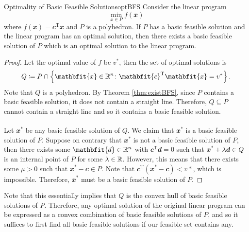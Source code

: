 \documentclass[math, code]{amznotes}
\theoremstyle{remark}
\begin{document}
\begin{thmbox}{Optimality of Basic Feasible Solutions}{optBFS}
    Consider the linear program 
    \begin{equation*}
        \min_{\mathbfit{x} \in P} f(\mathbfit{x})
    \end{equation*}
    where $f(\mathbfit{x}) = \mathbfit{c}^{\mathrm{T}}\mathbfit{x}$ and $P$ is a polyhedron. If $P$ has a basic feasible solution and the linear program has an optimal solution, then there exists a basic feasible solution of $P$ which is an optimal solution to the linear program.
    \tcblower
    \begin{proof}
        Let the optimal value of $f$ be $v^*$, then the set of optimal solutions is
        \begin{equation*}
            Q \coloneqq P \cap \left\{\mathbfit{x} \in \R^n \colon \mathbfit{c}^{\mathrm{T}}\mathbfit{x} = v^*\right\}.
        \end{equation*}
        Note that $Q$ is a polyhedron. By Theorem \ref{thm:existBFS}, since $P$ contains a basic feasible solution, it does not contain a straight line. Therefore, $Q \subseteq P$ cannot contain a straight line and so it contains a basic feasible solution.
        \\\\
        Let $\mathbfit{x}^*$ be any basic feasible solution of $Q$. We claim that $\mathbfit{x}^*$ is a basic feasible solution of $P$. Suppose on contrary that $\mathbfit{x}^*$ is not a basic feasible solution of $P$, then there exists some $\mathbfit{d} \in \R^n$ with $\mathbfit{c}^{\mathrm{T}}\mathbfit{d} = 0$ such that $\mathbfit{x}^* + \lambda\mathbfit{d} \in Q$ is an internal point of $P$ for some $\lambda \in \mathbb{R}$. However, this means that there exists some $\mu > 0$ such that $\mathbfit{x}^* - \mathbfit{c} \in P$. Note that $\mathbfit{c}^{\mathrm{T}}\left(\mathbfit{x}^* - \mathbfit{c}\right) < v*$, which is impossible. Therefore, $\mathbfit{x}^*$ must be a basic feasible solution of $P$.
    \end{proof}
\end{thmbox}
Note that this essentially implies that $Q$ is the convex hull of basic feasible solutions of $P$. Therefore, any optimal solution of the original linear program can be expressed as a convex combination of basic feasible solutions of $P$, and so it suffices to first find all basic feasible solutions if our feasible set contains any.
\end{document}
